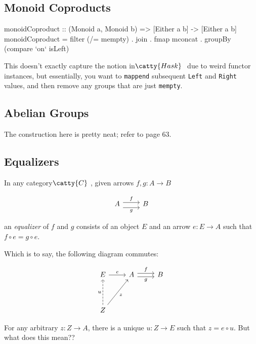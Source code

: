 \documentclass[]{article}
\newcommand{\tfarr}[4][\to]{\ensuremath{#2 : #3 #1 #4}}
\newcommand{\cat}[1]{\ensuremath{\!\! \catty{#1} \,\,}}
\begin{document}
\subsection{Monoid Coproducts}

\begin{code}
monoidCoproduct :: (Monoid a, Monoid b) => [Either a b] -> [Either a b]
monoidCoproduct = filter (/= mempty)
                . join
                . fmap mconcat
                . groupBy (compare `on` isLeft)
\end{code}

This doesn't exactly capture the notion in \cat{Hask} due to weird functor
instances, but essentially, you want to \texttt{mappend} subsequent
\texttt{Left} and \texttt{Right} values, and then remove any groups that are
just \texttt{mempty}.

\subsection{Abelian Groups}


The construction here is pretty neat; refer to page 63.

\subsection{Equalizers}

In any category \cat{C}, given arrows \tfarr{f,g}{A}{B}

$$\begin{tikzcd}
  A \arrow[shift right=2,swap]{r}{g} \arrow[shift left=1]{r}{f} & B
\end{tikzcd}$$

an \textit{equalizer} of $f$ and $g$ consists of an object $E$ and an arrow
\tfarr{e}{E}{A} such that $f\circ e = g\circ e$.

Which is to say, the following diagram commutes:

$$\begin{tikzcd}
  E\arrow{r}{e} & A \arrow[shift right=1,swap]{r}{g} \arrow[shift left=1]{r}{f} & B \\
  & & \\
  Z \arrow[dashed]{uu}{u} \arrow[swap]{uur}{z} & &
\end{tikzcd}$$

For any arbitrary \tfarr{z}{Z}{A}, there is a unique \tfarr{u}{Z}{E} such that
$z = e\circ u$. But what does this mean??
\end{document}
